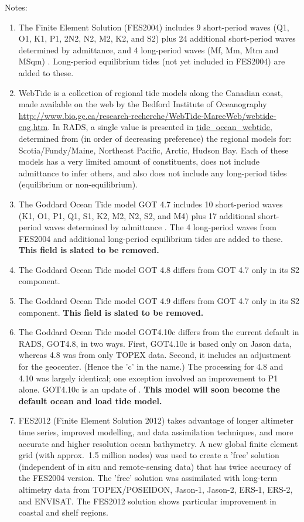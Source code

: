 \documentclass[a4paper,11pt,openany,natbib]{thesis}
\makeatletter
\newcommand\var[1]{\url{#1}\index{variables!#1@\protect\url{#1}}}
\makeatother
\begin{document}
Notes:
\begin{enumerate}
\item The Finite Element Solution (FES2004) includes 9 short-period waves (Q1, O1, K1, P1, 2N2, N2, M2, K2, and S2) plus 24 additional short-period waves determined by admittance, and 4 long-period waves (Mf, Mm, Mtm and MSqm) \citep{lyard2006}. Long-period equilibrium tides (not yet included in FES2004) are added to these.\label{item:tide_ocean_fes04}\label{item:tide_load_fes04}
\item WebTide is a collection of regional tide models along the Canadian coast, made available on the web by the Bedford Institute of Oceanography \url{http://www.bio.gc.ca/research-recherche/WebTide-MareeWeb/webtide-eng.htm}. In RADS, a single value is presented in \var{tide_ocean_webtide}, determined from (in order of decreasing preference) the regional models for: Scotia/Fundy/Maine, Northeast Pacific, Arctic, Hudson Bay. Each of these models has a very limited amount of constituents, does not include admittance to infer others, and also does not include any long-period tides (equilibrium or non-equilibrium).\label{item:tide_ocean_webtide}
\item The Goddard Ocean Tide model GOT 4.7 includes 10 short-period waves (K1, O1, P1, Q1, S1, K2, M2, N2, S2, and M4) plus 17 additional short-period waves determined by admittance \citep{ray2011}. The 4 long-period waves from FES2004 and additional long-period equilibrium tides are added to these.\label{item:tide_ocean_got47}\label{item:tide_load_got47}
\textbf{This field is slated to be removed.}
\item The Goddard Ocean Tide model GOT 4.8 differs from GOT 4.7 only in its S2 component.\label{item:tide_ocean_got48}\label{item:tide_load_got48}
\item The Goddard Ocean Tide model GOT 4.9 differs from GOT 4.7 only in its S2 component.\label{item:tide_ocean_got49}\label{item:tide_load_got49}
\textbf{This field is slated to be removed.}
\item The Goddard Ocean Tide model GOT4.10c differs from the current default in RADS, GOT4.8, in two ways. First, GOT4.10c is based only on Jason data, whereas 4.8 was from only TOPEX data. Second, it includes an adjustment for the geocenter. (Hence the 'c' in the name.) The processing for 4.8 and 4.10 was largely identical; one exception involved an improvement to P1 alone. GOT4.10c is an update of \citet{ray2013}.\label{item:tide_ocean_got410}\label{item:tide_load_got410}
\textbf{This model will soon become the default ocean and load tide model.}
\item FES2012 (Finite Element Solution 2012) takes advantage of longer altimeter time series, improved modelling, and data assimilation techniques, and more accurate and higher resolution ocean bathymetry. A new global finite element grid (with approx.\ 1.5 million nodes) was used to create a  'free' solution (independent of in situ and remote-sensing data) that has twice accuracy of the FES2004 version. The 'free' solution was assimilated with long-term altimetry data from TOPEX/POSEIDON, Jason-1, Jason-2, ERS-1, ERS-2, and ENVISAT. The FES2012 solution shows particular improvement in coastal and shelf regions.


\end{enumerate}
\end{document}
